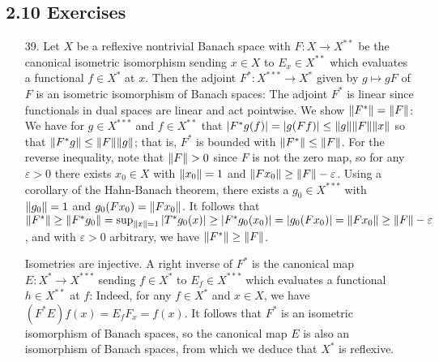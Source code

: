 \documentclass[11pt,leqno]{article}
\theoremstyle{plain}
\theoremstyle{definition}
\numberwithin{equation}{section}
\numberwithin{lem}{section}
\begin{document}
\subsection*{2.10 Exercises}
\begin{enumerate}
  \item[39.] Let $X$ be a reflexive nontrivial Banach space with $F\colon X\to X^{\ast\ast}$ be the canonical isometric isomorphism sending $x\in X$ to $E_x\in X^{\ast\ast}$ which evaluates a functional $f\in X^\ast$ at $x$. Then the adjoint $F^\ast\colon X^{\ast\ast\ast}\to X^\ast$ given by $g\mapsto gF$ of $F$ is an isometric isomorphism of Banach spaces: The adjoint $F^\ast$ is linear since functionals in dual spaces are linear and act pointwise. We show $\norm{F^\ast} = \norm{F}$: We have for $g\in X^{\ast\ast\ast}$ and $f\in X^{\ast\ast}$ that $\abs{F^\ast g(f)} = \abs{g(Ff)} \leq \norm{g}\norm{F}\norm{x}$ so that $\norm{F^\ast g}\leq \norm{F}\norm{g}$; that is, $F^\ast$ is bounded with $\norm{F^\ast}\leq \norm{F}$. For the reverse inequality, note that $\norm{F}>0$ since $F$ is not the zero map, so for any $\varepsilon>0$ there exists $x_0\in X$ with $\norm{x_0} = 1$ and $\norm{Fx_0}\geq \norm{F} - \varepsilon$. Using a corollary of the Hahn-Banach theorem, there exists a $g_0\in X^{\ast\ast\ast}$ with $\norm{g_0} = 1$ and $g_0(Fx_0) = \norm{Fx_0}$. It follows that $\norm{F^\ast}\geq \norm{F^\ast g_0} = \sup_{\norm{x} =1}\abs{T^\ast g_0(x)}\geq \abs{F^\ast g_0(x_0)} = \abs{g_0(Fx_0)} = \norm{Fx_0}\geq \norm{F} - \varepsilon$, and with $\varepsilon>0$ arbitrary, we have $\norm{F^\ast}\geq \norm{F}$.
  
  Isometries are injective. A right inverse of $F^\ast$ is the canonical map $E\colon X^\ast\to X^{\ast\ast\ast}$ sending $f\in X^\ast$ to $E_f\in X^{\ast\ast\ast}$ which evaluates a functional $h\in X^{\ast\ast}$ at $f$: Indeed, for any $f\in X^\ast$ and $x\in X$, we have $(F^\ast E)f(x) = E_fF_x = f(x)$. It follows that $F^\ast$ is an isometric isomorphism of Banach spaces, so the canonical map $E$ is also an isomorphism of Banach spaces, from which we deduce that $X^\ast$ is reflexive.


\end{enumerate}
\end{document}

